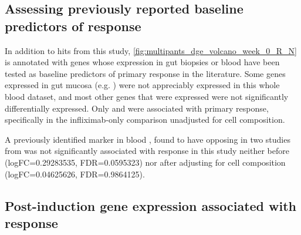 \begin{outline}
\subsection{Assessing previously reported baseline predictors of response}

In addition to hits from this study, \autoref{fig:multipants_dge_volcano_week_0_R_N} is annotated with genes whose expression in gut biopsies or blood have been tested as baseline predictors of primary response in the literature\autocite{arijs2009MucosalGeneSignatures,arijs2010PredictiveValueEpithelial,verstockt2019LowTREM1Expression,salvador-martin2020GeneSignaturesEarly}.
Some genes expressed in gut mucosa (e.g. ) were not appreciably expressed in this whole blood dataset, 
and most other genes that were expressed were not significantly differentially expressed.
Only  and  were associated with primary response, specifically in the infliximab-only comparison unadjusted for cell composition.

A previously identified marker in blood , found to have opposing in two studies from \autocite{gaujoux2019CellcentredMetaanalysisReveals,verstockt2019LowTREM1Expression}
was not significantly associated with response in this study neither
before (logFC=\num{0.29283535}, FDR=\num{0.0595323})
nor after adjusting for cell composition (logFC=\num{0.04625626}, FDR=\num{0.9864125}).




\subsection{Post-induction gene expression associated with response}


\end{outline}
